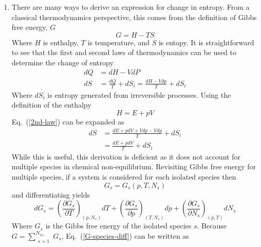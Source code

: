 \documentclass[a4paper]{report}
\newcommand{\eref}[1]{Eq.~(\ref{#1})}
\begin{document}
\begin{enumerate}
  \item There are many ways to derive an expression for change in entropy.  From
    a classical thermodynamics perspective, this comes from the definition of
    Gibbs free energy, $G$
    \begin{equation}
      G = H - TS
      \label{gfe-def}
    \end{equation}
    Where $H$ is enthalpy, $T$ is temperature, and $S$ is entopy.  It is
    straightforward to see that the first and second laws of thermodynamics can
    be used to determine the change of entropy
    \begin{align}
      dQ &= dH - VdP \label{1st-law}\\
      dS &= \frac{dQ}{T} + dS_{i}= \frac{dH - Vdp}{T} + dS_{i}
      \label{2nd-law}
    \end{align}
    Where $dS_i$ is entropy generated from irreversible processes. Using the
    definition of the enthalpy \begin{equation}
      H = E + pV
      \label{enthalpy-def}
    \end{equation}
    \eref{2nd-law} can be expanded as
    \begin{equation}
      \begin{aligned}
	dS &= \frac{dE + pdV + Vdp - Vdp}{T} + dS_i\\
	   &= \frac{dE + pdV}{T} + dS_i
      \end{aligned}
      \label{s-one-gas}
    \end{equation}
    While this is useful, this derivation is deficient as it does not account
    for multiple species in chemical non-equilibrium.  Revisiting Gibbs free
    energy for multiple species, if a system is considered for each isolated
    species then
    \begin{equation}
      G_s = G_s(p,T,N_s)
      \label{G-species-def}
    \end{equation}
    and differentiating yields
    \begin{equation}
      dG_s = \left( \frac{\partial G_s}{\partial T} \right)_{(p,N_s)} dT
      + \left( \frac{\partial G_s}{\partial p} \right)_{(T,N_s)} dp
      + \left( \frac{\partial G_s}{\partial N_s} \right)_{(p,T)} dN_s
      \label{G-species-diff}
    \end{equation}
    Where $G_s$ is the Gibbs free energy of the isolated species $s$. Because 
    $G = \sum\limits_{\substack{s=1}}^{N_{ns}}{G_s}$, \eref{G-species-diff} can
    be written as
    \begin{equation}

\end{equation}
\end{enumerate}
\end{document}
